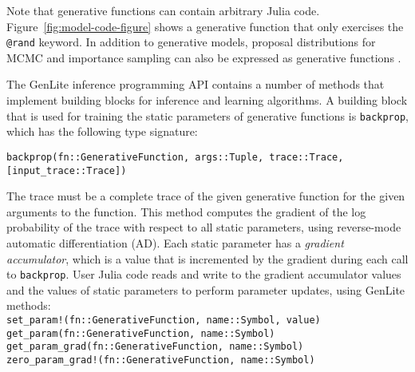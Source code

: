 Note that generative functions can contain arbitrary Julia code.
Figure~\ref{fig:model-code-figure} shows a generative function that only exercises the \texttt{@rand} keyword.
In addition to generative models, proposal distributions for MCMC and importance sampling can also be expressed as generative functions \cite{cusumano2018using}.

The GenLite inference programming API contains a number of methods that implement building blocks for inference and learning algorithms.
A building block that is used for training the static parameters of generative functions is \texttt{backprop}, which has the following type signature:
\begin{center}
    \texttt{backprop(fn::GenerativeFunction, args::Tuple, trace::Trace, [input\_trace::Trace])}
\end{center}
The trace must be a complete trace of the given generative function for the given arguments to the function.
This method computes the gradient of the log probability of the trace with respect to all static parameters, using reverse-mode automatic differentiation (AD).
Each static parameter has a \emph{gradient accumulator}, which is a value that is incremented by the gradient during each call to \texttt{backprop}.
User Julia code reads and write to the gradient accumulator values and the values of static parameters to perform parameter updates, using GenLite methods:\\
\texttt{set\_param!(fn::GenerativeFunction, name::Symbol, value)}\\
\texttt{get\_param(fn::GenerativeFunction, name::Symbol)}\\
\texttt{get\_param\_grad(fn::GenerativeFunction, name::Symbol)}\\
\texttt{zero\_param\_grad!(fn::GenerativeFunction, name::Symbol)}

